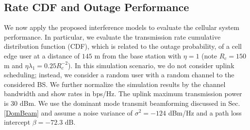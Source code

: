\documentclass[12pt, draftclsnofoot, onecolumn]{IEEEtran}
\theoremstyle{plain}
\begin{document}
\subsection{Rate CDF and Outage Performance}\label{perfeval}
\vspace{-.1in}
We now apply the proposed interference models to evaluate the cellular system performance. In particular, we evaluate the transmission rate cumulative distribution function (CDF), which is related to the outage probability, of a cell edge user at a distance of $145$ m from {the base station} with $\eta=1$ (note $R_c=150$ m and $\eta \lambda_1=0.25 R_c^{-2}$). {In this simulation scenario, we do not consider uplink scheduling; instead, we consider a random user with a random channel to the considered BS. We further normalize the simulation results by the channel bandwidth and show rates in bps/Hz.} %
The uplink maximum transmission power is $30$ dBm. 
We use the dominant mode {\color{black}transmit} beamforming discussed in Sec. \ref{DomBeam} and assume a noise variance of {$\sigma^2=-124$ dBm/Hz} and a path loss intercept $\beta=-72.3$ dB. 
\end{document}

